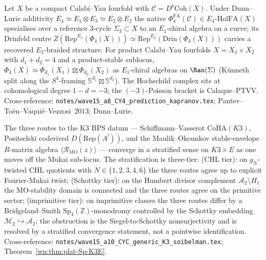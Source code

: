 \begin{theorem}[$\Phi_4$ at $d = 4$: $E_2$-on-centre]\ClaimStatusTheorem
\label{wn:thm:plat-w15-phi4-E2}
Let $X$ be a compact Calabi--Yau fourfold with
$\mathcal{C} = D^b\mathrm{Coh}(X)$. Under Dunn--Lurie additivity
$E_4 \simeq E_1 \otimes E_3 \simeq E_2 \otimes E_2$ the native
$\Phi_4^{\mathrm{FA}}(\mathcal{C}) \in E_4\text{-}\mathrm{HolFA}(X)$
specialises over a reference $3$-cycle $\Sigma_3 \subset X$ to an
$E_1$-chiral algebra on a curve; its Drinfeld centre
$Z(\mathrm{Rep}^{E_1}(\Phi_4(X))) \simeq
\mathrm{Rep}^{E_2}(\mathrm{Drin}(\Phi_4(X)))$ carries a recovered
$E_2$-braided structure. For product Calabi--Yau fourfolds
$X = X_1 \times X_2$ with $d_1 + d_2 = 4$ and a product-stable
sublocus, $\Phi_4(X) \simeq \Phi_{d_1}(X_1) \boxtimes \Phi_{d_2}(X_2)$
as $E_1$-chiral algebras on $\Ran(\Sigma)$ (K\"unneth split along the
$S^4$-framing $\mathbb{S}^{d_1} \boxtimes \mathbb{S}^{d_2}$). The
Hochschild complex sits at cohomological degree $1 - d = -3$; the
$(-3)$-Poisson bracket is Calaque--PTVV.
Cross-reference: \texttt{notes/wave15\_a8\_CY4\_prediction\_kapranov.tex};
Pantev--To\"en--Vaqui\'e--Vezzosi~$2013$; Dunn--Lurie.
\end{theorem}

\begin{theorem}\ClaimStatusTheorem
\label{wn:thm:plat-w15-CYC-generic}
The three routes to the K$3$ BPS datum --- Schiffmann--Vasserot
$\mathrm{CoHA}(K3)$, Positselski coderived $D(\mathrm{Rep}(A^!))$, and
the Maulik--Okounkov stable-envelope $R$-matrix algebra
$\langle \mathcal{R}_{\mathrm{MO}}(z) \rangle$ --- converge in a
stratified sense on $K3 \times E$ as one moves off the Mukai
sub-locus. The stratification is three-tier:
\textup{(CHL tier)}: on $g_N$-twisted CHL quotients with
$N \in \{1, 2, 3, 4, 6\}$ the three routes agree up to explicit
Fourier-Mukai twist;
\textup{(Schottky tier)}: on the Humbert divisor complement
$\mathcal{A}_2 \setminus H_1$ the MO-stability domain is connected
and the three routes agree on the primitive sector;
\textup{(imprimitive tier)}: on imprimitive classes the three routes
differ by a Bridgeland--Smith $\mathrm{Sp}_4(\mathbb{Z})$-monodromy
controlled by the Schottky embedding
$\mathcal{M}_2 \hookrightarrow \mathcal{A}_2$; the obstruction is
the Siegel-to-Schottky nonsurjectivity and is resolved by a
stratified convergence statement, not a pointwise identification.
Cross-reference: \texttt{notes/wave15\_a10\_CYC\_generic\_K3\_soibelman.tex};
Theorem~\ref{wn:thm:plat-Sp-K3E}.
\end{theorem}

